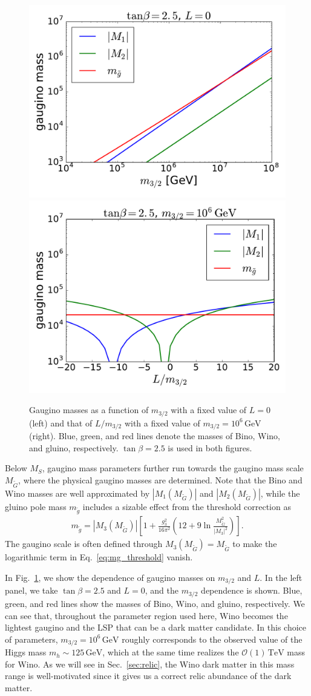 \documentclass[12pt,twoside,book]{article}
\begin{document}
\begin{figure}
  \centering
  \includegraphics[width=0.48\hsize]{amsb_m32.pdf}
  \includegraphics[width=0.48\hsize]{amsb_L.pdf}
  \caption{
    Gaugino masses as a function of $m_{3/2}$ with a fixed value of $L = 0$ (left) and that of $L / m_{3/2}$ with a fixed value of $m_{3/2} = 10^6\,\mathrm{GeV}$ (right).
    Blue, green, and red lines denote the masses of Bino, Wino, and gluino, respectively.
    $\tan\beta = 2.5$ is used in both figures.
  }
  \label{fig:amsb_spectrum}
\end{figure}

Below $M_S$, gaugino mass parameters further run towards the gaugino mass scale $M_{\tilde{G}}$, where the physical gaugino masses are determined.
Note that the Bino and Wino masses are well approximated by $|M_1 (M_{\tilde{G}})|$ and $|M_2 (M_{\tilde{G}})|$, while the gluino pole mass $m_{\tilde{g}}$ includes a sizable effect from the threshold correction as \cite{Giudice:2004tc}
\begin{align}
  m_{\tilde{g}} = \left| M_3 (M_{\tilde{G}}) \right| \left[
  1 + \frac{g_3^2}{16\pi^2} \left( 12 + 9\ln \frac{M_{\tilde{G}}^2}{|M_3|^2} \right)
  \right].
  \label{eq:mg_threshold}
\end{align}
The gaugino scale is often defined through $M_3 (M_{\tilde{G}}) = M_{\tilde{G}}$ to make the logarithmic term in Eq.~\eqref{eq:mg_threshold} vanish.

In Fig.~\ref{fig:amsb_spectrum}, we show the dependence of gaugino masses on $m_{3/2}$ and $L$.
In the left panel, we take $\tan\beta = 2.5$ and $L=0$, and the $m_{3/2}$ dependence is shown.
Blue, green, and red lines show the masses of Bino, Wino, and gluino, respectively.
We can see that, throughout the parameter region used here, Wino becomes the lightest gaugino and the LSP that can be a dark matter candidate.
In this choice of parameters, $m_{3/2} = 10^6\,\mathrm{GeV}$ roughly corresponds to the observed value of the Higgs mass $m_h \sim 125\,\mathrm{GeV}$, which at the same time realizes the $\mathcal{O}(1)\,\mathrm{TeV}$ mass for Wino.
As we will see in Sec.~\ref{sec:relic}, the Wino dark matter in this mass range is well-motivated since it gives us a correct relic abundance of the dark matter.
\end{document}
